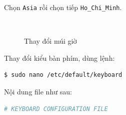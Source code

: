\begin{list}{--}{}
Chọn \verb|Asia| rồi chọn tiếp \verb|Ho_Chi_Minh|.
\begin{figure}[!h]
\begin{center}
\\
\end{center}
\caption{Thay đổi múi giờ}
\end{figure}
\newpage
\item Thay đổi kiểu bàn phím, dùng lệnh:
\begin{lstlisting}[language=bash]
$ sudo nano /etc/default/keyboard
\end{lstlisting}
Nội dung file như sau:
\begin{lstlisting}[language=bash]
# KEYBOARD CONFIGURATION FILE


\end{lstlisting}
\end{list}
